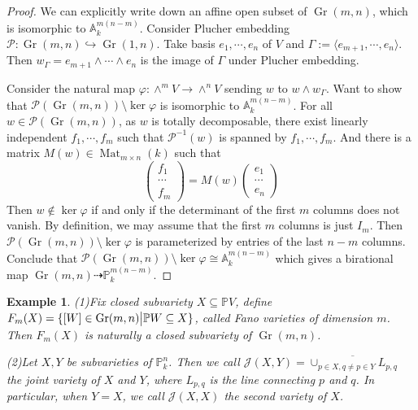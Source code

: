 \documentclass{ctexart}
\newtheorem{example}{Example}[section]
\newcommand{\grassmannianscheme}[2]{\operatorname{Gr}(#1, #2)}
\newcommand{\matrices}[2]{\operatorname{Mat}_{#1}(#2)}
\begin{document}
\begin{proof}
    We can explicitly write down an affine open subset of $\grassmannianscheme{m}{n}$, which is isomorphic to $\mathbb{A}_{k}^{m(n - m)}$.
    Consider Plucher embedding $\mathcal{P}: \grassmannianscheme{m}{n} \hookrightarrow \grassmannianscheme{1}{n}$.
    Take basis $e_{1}, \cdots, e_{n}$ of $V$ and $\Gamma := \langle e_{m + 1}, \cdots, e_{n} \rangle$.
    Then $w_{\Gamma} = e_{m + 1} \wedge \cdots \wedge e_{n}$ is the image of $\Gamma$ under Plucher embedding.
    \par
    Consider the natural map $\varphi: \wedge^{m}V \rightarrow \wedge^{n}V$ sending $w$ to $w \wedge w_{\Gamma}$.
    Want to show that $\mathcal{P}(\grassmannianscheme{m}{n}) \setminus \ker \varphi$ is isomorphic to $\mathbb{A}_{k}^{m(n - m)}$.
    For all $w\in \mathcal{P}(\grassmannianscheme{m}{n})$, as $w$ is totally decomposable,
    there exist linearly independent $f_{1}, \cdots, f_{m}$ such that $\mathcal{P}^{-1}(w)$ is spanned by $f_{1}, \cdots, f_{m}$.
    And there is a matrix $M(w)\in \matrices{m \times n}{k}$ such that
    \begin{equation}
        \begin{pmatrix}
            f_{1} \\
            \cdots \\
            f_{m}
        \end{pmatrix}
        =
        M(w)
        \begin{pmatrix}
            e_{1} \\
            \cdots \\
            e_{n}
        \end{pmatrix}        
    \end{equation}
    Then $w\notin \ker \varphi$ if and only if the determinant of the first $m$ columns does not vanish.
    By definition, we may assume that the first $m$ columns is just $I_{m}$.
    Then $\mathcal{P}(\grassmannianscheme{m}{n}) \setminus \ker \varphi$ is parameterized by entries of the last $n - m$ columns.
    Conclude that $\mathcal{P}(\grassmannianscheme{m}{n}) \setminus \ker \varphi \cong \mathbb{A}_{k}^{m(n - m)}$ which gives a birational map $\grassmannianscheme{m}{n} \dashrightarrow \mathbb{P}_{k}^{m(n - m)}$.
\end{proof}
\begin{example}
    (1)Fix closed subvariety $X \subseteq \mathbb{P}V$,
    define $F_{m}(X) = \{[W]\in \grassmannianscheme{m}{n} \big{|} \mathbb{P}W \subseteq X\}$,
    called Fano varieties of dimension $m$.
    Then $F_{m}(X)$ is naturally a closed subvariety of $\grassmannianscheme{m}{n}$.
    \par
    (2)Let $X, Y$ be subvarieties of $\mathbb{P}_{k}^{n}$.
    Then we call $\mathcal{J}(X, Y) = \overline{\cup_{p\in X, q \neq p\in Y} L_{p, q}}$ the joint variety of $X$ and $Y$,
    where $L_{p, q}$ is the line connecting $p$ and $q$.
    In particular, when $Y = X$, we call $\mathcal{J}(X, X)$ the second variety of $X$.
\end{example}
\end{document}
